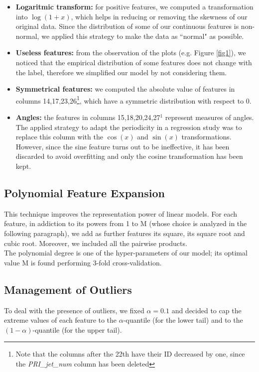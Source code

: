 \documentclass[10pt,conference,compsocconf]{IEEEtran}
\begin{document}
\begin{itemize}
    \item \textbf{Logaritmic transform:} for positive features, we computed a transformation into $\log(1+x)$, which helps in reducing or removing the skewness of our original data. Since the distribution of some of our continuous features is non-normal, we applied this strategy to make the data as ``normal" as possible. 
    \item \textbf{Useless features:} from the observation of the plots (e.g. Figure \ref{fig1}), we noticed that the empirical distribution of some features does not change with the label, therefore we simplified our model by not considering them.
    \item \textbf{Symmetrical features:} we computed the absolute value of features in columns 14,17,23,26\footnote{\label{note1}Note that the columns after the 22th have their ID decreased by one, since the \emph{PRI\_jet\_num} column has been deleted}, which have a symmetric distribution with respect to 0.
    \item \textbf{Angles:} the features in columns 15,18,20,24,27$^{\hyperref[note1]{1}}$ represent measures of angles. The applied strategy to adapt the periodicity in a regression study was to replace this column with the $\cos(x)$ and $\sin(x)$ transformations. However, since the sine feature turns out to be ineffective, it has been discarded to avoid overfitting and only the cosine transformation has been kept.
\end{itemize}

\subsection{Polynomial Feature Expansion}
This technique improves the representation power of linear models. For each feature, in addiction to its powers from 1 to M (whose choice is analyzed in the following paragraph), we add as further features its square, its square root and cubic root.
Moreover, we included all the pairwise products.\\
The polynomial degree is one of the hyper-parameters of our model; its optimal value M is found performing 3-fold cross-validation.

\subsection{Management of Outliers}
To deal with the presence of outliers, we fixed $\alpha = 0.1$ and decided to cap the extreme values of each feature to the $\alpha$-quantile (for the lower tail) and to the $(1-\alpha)$-quantile (for the upper tail).
\end{document}
